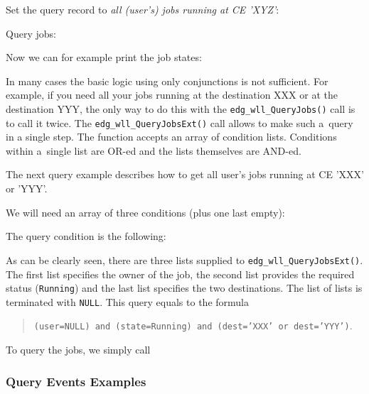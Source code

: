 Set the query record to \emph{all (user's) jobs running at CE 'XYZ'}:


Query jobs:


Now we can for example print the job states:



In many cases the basic logic using only conjunctions is not sufficient.
For example, if you need all your jobs running at the destination XXX or at
the destination YYY, the only way to do this with the \texttt{edg\_wll\_QueryJobs()}
call is to call it twice. The \texttt{edg\_wll\_QueryJobsExt()} call allows to make
such a~query in a single step.
The function accepts an array of condition lists. Conditions within a~single list are
OR-ed and the lists themselves are AND-ed.

The next query example describes how to get all user's jobs running at
CE 'XXX' or 'YYY'. 

We will need an array of three conditions (plus one last empty):



The query condition is the following:



As can be clearly seen, there are three lists supplied to
\texttt{edg\_wll\_QueryJobsExt()}. The first list specifies the owner of the
job, the second list provides the required status (\texttt{Running}) and
the last list specifies the two destinations.
The list of lists is terminated with \texttt{NULL}.
This query equals to the formula
\begin{quote}
\texttt{(user=NULL) and (state=Running) and (dest='XXX' or dest='YYY')}.
\end{quote}

To query the jobs, we simply call




\subsubsection{Query Events Examples}


